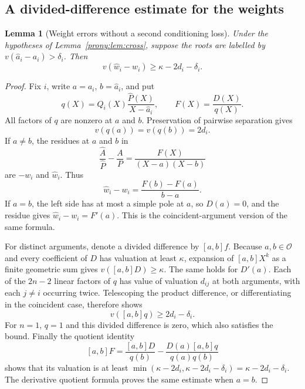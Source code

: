 \documentclass[11pt,letterpaper]{article}
\newtheorem{lemma}[theorem]{Lemma}
\theoremstyle{definition}
\theoremstyle{remark}
\newcommand{\Ocal}{\mathcal O}
\newcommand{\Ph}{\widehat P}
\newcommand{\Ah}{\widehat A}
\newcommand{\ah}{\widehat a}
\newcommand{\wh}{\widehat w}
\begin{document}
\subsection{A divided-difference estimate for the weights}
\begin{lemma}[Weight errors without a second conditioning loss]
\label{prony:lem:weight}
Under the hypotheses of Lemma~\ref{prony:lem:cross}, suppose the roots are labelled
by $v(\ah_i-a_i)>\delta_i$. Then
\[
 v(\wh_i-w_i)\ge\kappa-2d_i-\delta_i.
\]
\end{lemma}
\begin{proof}
Fix $i$, write $a=a_i$, $b=\ah_i$, and put
\[
 q(X)=Q_i(X)\frac{\Ph(X)}{X-\ah_i},\qquad F(X)=\frac{D(X)}{q(X)}.
\]
All factors of $q$ are nonzero at $a$ and $b$. Preservation of pairwise
separation gives
\begin{equation}\label{prony:eq:qval}
 v(q(a))=v(q(b))=2d_i.
\end{equation}
If $a\ne b$, the residues at $a$ and $b$ in
\[
 \frac{\Ah}{\Ph}-\frac A P=\frac{F(X)}{(X-a)(X-b)}
\]
are $-w_i$ and $\wh_i$. Thus
\begin{equation}\label{prony:eq:weightdd}
 \wh_i-w_i=\frac{F(b)-F(a)}{b-a}.
\end{equation}
If $a=b$, the left side has at most a simple pole at $a$, so $D(a)=0$,
and the residue gives $\wh_i-w_i=F'(a)$. This is the coincident-argument
version of the same formula.

For distinct arguments, denote a divided difference by $[a,b]f$.
Because $a,b\in\Ocal$ and every coefficient of $D$ has valuation at least
$\kappa$, expansion of $[a,b]X^k$ as a finite geometric sum gives
$v([a,b]D)\ge\kappa$. The same holds for $D'(a)$.
Each of the $2n-2$ linear factors of $q$ has value of valuation $d_{ij}$
at both arguments, with each $j\ne i$ occurring twice. Telescoping the
product difference, or differentiating in the coincident case, therefore
shows
\[
 v([a,b]q)\ge 2d_i-\delta_i.
\]
For $n=1$, $q=1$ and this divided difference is zero, which also satisfies
the bound. Finally the quotient identity
\[
 [a,b]F=\frac{[a,b]D}{q(b)}
       -\frac{D(a)[a,b]q}{q(a)q(b)}
\]
shows that its valuation is at least
$\min(\kappa-2d_i,\kappa-2d_i-\delta_i)=\kappa-2d_i-\delta_i$.
The derivative quotient formula proves the same estimate when $a=b$.
\end{proof}
\end{document}
